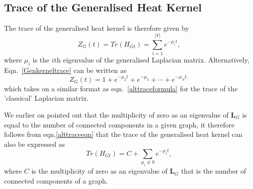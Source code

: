 \documentclass[10pt,a4paper]{article}
\begin{document}
        \subsection{Trace of the Generalised Heat Kernel}
        The trace of the generalised heat kernel is therefore given by
        \begin{equation}
        Z_{G}(t) = Tr(H_{Gt}) = \sum_{i=1}^{|V|} e^{-\mu_i t},
        \label{Genkerneltrace}
        \end{equation}
         where $\mu_{i}$ is the $i$th eigenvalue of the generalised Laplacian matrix.
        Alternatively, Eqn.~\ref{Genkerneltrace} can be written as 
        \begin{equation}
        Z_{G}(t) =  1+ e^{-\mu_{2} t} + e^{-\mu_{3}} + \cdots + e^{-\mu_{N} t,}
        \label{alttraceeqn}
        \end{equation}
        which takes on a similar format as eqn.~\ref{alttraceformula} for the trace of the 'classical' Laplacian matrix.
        
        We earlier on pointed out that the multiplicity of zero as an eigenvalue of $\mathbf{L}_G$ is equal to the number of connected components in a given graph, it therefore follows from eqn.\ref{alttraceeqn} that 
        the trace of the generalised heat kernel can also be expressed as 
        \begin{equation}
        Tr(H_{Gt}) = C + \sum_{\mu_i \neq 0} e^{-\mu_i t}
        \label{kernelexp2},
        \end{equation}
        where $C$ is the multiplicity of zero as an eigenvalue of $\mathbf{L}_G$ that is the number of connected components of a graph.
        
\end{document}
